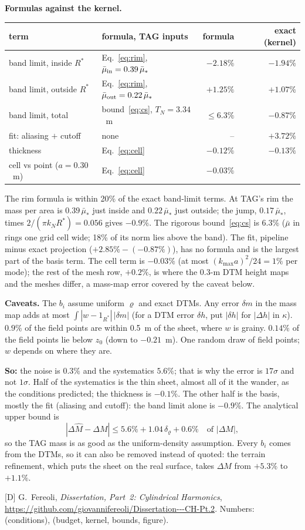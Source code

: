 \documentclass[11pt]{article}
\begin{document}
\textbf{Formulas against the kernel.}
\par{\centering\small
\begin{tabular}{llrr}
\toprule
term & formula, TAG inputs & formula & exact (kernel)\\
\midrule
band limit, inside $R^*$ & Eq.~\eqref{eq:rim}, $\bar\mu_{\rm in}=0.39\,\bar\mu_*$ & $-2.18\%$ & $-1.94\%$\\
band limit, outside $R^*$ & Eq.~\eqref{eq:rim}, $\bar\mu_{\rm out}=0.22\,\bar\mu_*$ & $+1.25\%$ & $+1.07\%$\\
band limit, total & bound~\eqref{eq:cs}, $T_N=3.34$~m & $\le6.3\%$ & $-0.87\%$\\
fit: aliasing $+$ cutoff & none & -- & $+3.72\%$\\
thickness & Eq.~\eqref{eq:cell} & $-0.12\%$ & $-0.13\%$\\
cell vs point ($a=0.30$~m) & Eq.~\eqref{eq:cell} & $-0.03\%$ & \\
\bottomrule
\end{tabular}\par}
\smallskip
The rim formula is within 20\% of the exact band-limit terms. At TAG's rim
the mass per area is $0.39\,\bar\mu_*$ just inside and $0.22\,\bar\mu_*$ just
outside; the jump, $0.17\,\bar\mu_*$, times $2/(\pi k_NR^*)=0.056$ gives
$-0.9\%$. The rigorous bound~\eqref{eq:cs} is $6.3\%$ ($\bar\mu$ in rings one
grid cell wide; 18\% of its norm lies above the band). The fit, pipeline minus
exact projection ($+2.85\%-(-0.87\%)$), has no formula and is the largest part
of the basis term. The cell term is $-0.03\%$ (at most $(k_{\max}a)^2/24=1\%$
per mode); the rest of the mesh row, $+0.2\%$, is where the 0.3-m DTM height
maps and the meshes differ, a mass-map error covered by the caveat below.

\textbf{Caveats.} The $b_i$ assume uniform $\varrho$ and exact DTMs. Any error
$\delta m$ in the mass map adds at most $\int|w-1_{R^*}|\,|\delta m|$ (for a
DTM error $\delta h$, put $|\delta h|$ for $|\Delta h|$ in $\kappa$). $0.9\%$ of the
field points are within 0.5~m of the sheet, where $w$ is grainy.
$0.14\%$ of the field points lie below $z_0$ (down to $-0.21$~m). One random
draw of field points; $w$ depends on where they are.

\textbf{So:} the noise is $0.3\%$ and the systematics $5.6\%$; that is why the
error is $17\sigma$ and not $1\sigma$. Half of the systematics is the thin
sheet, almost all of it the wander, as the conditions predicted; the thickness
is $-0.1\%$. The other half is the basis, mostly the fit (aliasing and
cutoff): the band limit alone is $-0.9\%$. The analytical upper bound is
\begin{equation}
  |\Delta\hat M-\Delta M|\le5.6\%+1.04\,\delta_\varrho+0.6\%\quad\text{of }|\Delta M|,
\end{equation}
so the TAG mass is as good as the uniform-density assumption. Every $b_i$
comes from the DTMs, so it can also be removed instead of quoted: the terrain
refinement, which puts the sheet on the real surface, takes $\Delta M$ from
$+5.3\%$ to $+1.1\%$.

\vspace{4pt}
{\small [D] G.~Fereoli, \emph{Dissertation, Part~2: Cylindrical Harmonics},
\url{https://github.com/giovannifereoli/Dissertation---CH-Pt.2}.
Numbers:  (conditions),  (budget, kernel, bounds, figure).}
\end{document}
